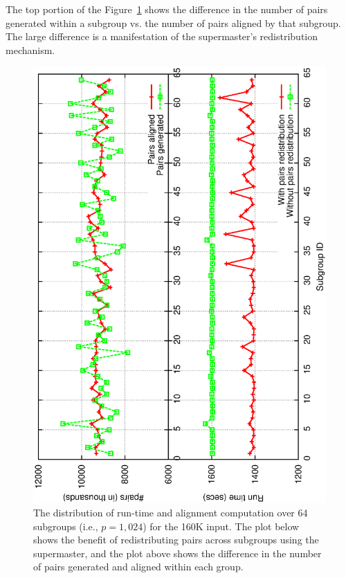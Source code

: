 \documentclass[10pt,journal,letterpaper,compsoc]{IEEEtran}
\begin{document}
The top portion of the Figure~\ref{figSPvalue} shows the difference in the number of pairs generated within a subgroup vs. the number of pairs aligned by that subgroup. The large difference is a manifestation of the supermaster's redistribution mechanism.

\begin{figure}[h]
\centerline{
            \includegraphics[angle=-90, scale=0.33]{subgroups.eps}
}
\caption{
The distribution of run-time and alignment computation over 64 subgroups (i.e., $p=1,024$) for the 160K input. The plot below shows the benefit of redistributing pairs across subgroups using the supermaster, and the plot above shows the difference in the number of pairs generated and aligned within each group. 
}
\label{figSPvalue}
\end{figure}
\end{document}
